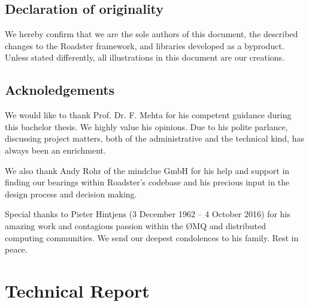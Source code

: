 \documentclass[a4paper]{report}
\newcommand\zmq{{\O}MQ\xspace}
\begin{document}
\chapter*{Declaration of originality}
We hereby confirm that we are the sole authors of this document, the
described changes to the Roadster framework, and libraries developed as a
byproduct. Unless stated differently, all illustrations in this document are
our creations.

%

\chapter*{Acknoledgements}
We would like to thank Prof. Dr. F. Mehta for his competent guidance during
this bachelor thesis.  We highly value his opinions. Due to his polite
parlance, discussing project matters, both of the administrative and the technical
kind, has always been an enrichment.

We also thank Andy Rohr of the mindclue GmbH for his help and support in
finding our bearings within Roadster's codebase and his precious input in the
design process and decision making.

Special thanks to Pieter Hintjens {\textdagger} (3 December 1962 -- 4 October
2016) for his amazing work and contagious passion within the \zmq and
distributed computing communities. We send our deepest condolences to his
family. Rest in peace.


\setcounter{tocdepth}{3}
\tableofcontents
\listoffigures
\listoftables
\listoflistings

\pagebreak
{}
\setcounter{page}{1}
\setcounter{secnumdepth}{3}



\part{Technical Report}







\printbibliography
\printglossaries
\end{document}
